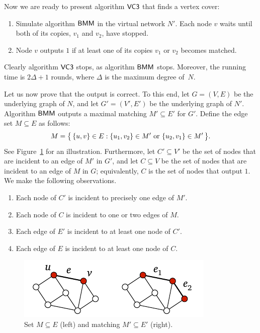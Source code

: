 Now we are ready to present algorithm $\textsf{VC3}$ that finds a vertex cover:
\begin{enumerate}
    \item Simulate algorithm $\textsf{BMM}$ in the virtual network $N'$. Each node $v$ waits until both of its copies, $v_1$ and $v_2$, have stopped.
    \item Node $v$ outputs $1$ if at least one of its copies $v_1$ or $v_2$ becomes matched.
\end{enumerate}

Clearly algorithm $\textsf{VC3}$ stops, as algorithm $\textsf{BMM}$ stops. Moreover, the running time is $2\Delta+1$ rounds, where $\Delta$ is the maximum degree of~$N$.

Let us now prove that the output is correct. To this end, let $G = (V,E)$ be the underlying graph of $N$, and let $G' = (V'\!,E')$ be the underlying graph of $N'$. Algorithm $\textsf{BMM}$ outputs a maximal matching $M' \subseteq E'$ for $G'$. Define the edge set $M \subseteq E$ as follows:
\begin{equation}\label{eq:vc3-M}
    M = \bigl\{\,  \{u,v\} \in E : \{u_1,v_2\} \in M' \text{ or } \{u_2,v_1\} \in M'  \,\bigr\}.
\end{equation}
See Figure~\ref{fig:vc3b} for an illustration. Furthermore, let $C' \subseteq V'$ be the set of nodes that are incident to an edge of $M'$ in $G'$, and let $C \subseteq V$ be the set of nodes that are incident to an edge of $M$ in $G$; equivalently, $C$ is the set of nodes that output $1$. We make the following observations.
\begin{enumerate}[noitemsep]
    \item Each node of $C'$ is incident to precisely one edge of $M'$.
    \item\label{item:vc3deg} Each node of $C$ is incident to one or two edges of $M$.
    \item Each edge of $E'$ is incident to at least one node of $C'$.
    \item\label{item:vc3isvc} Each edge of $E$ is incident to at least one node of $C$.
\end{enumerate}
\begin{figure}
    \centering
    \includegraphics[page=\PVCThreeApxB]{figs.pdf}
    \caption{Set $M \subseteq E$ (left) and matching $M' \subseteq E'$ (right).}\label{fig:vc3b}
\end{figure}

